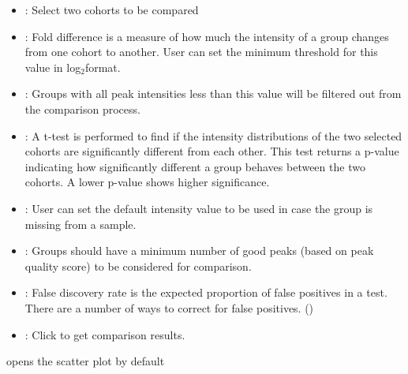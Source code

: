 \documentclass[letterpaper,10pt,english,openany,oneside]{sphinxmanual}
\begin{document}
\begin{itemize}
\item {} 
: Select two cohorts to be compared

\item {} 
: Fold difference is a measure of how much the intensity of a group changes from one cohort to another. User can set the minimum threshold for this value in log$_{\text{2}}$format.

\item {} 
: Groups with all peak intensities less than this value will be filtered out from the comparison process.

\item {} 
: A t-test is performed to find if the intensity distributions of the two selected cohorts are significantly different from each other. This test returns a p-value indicating how significantly different a group behaves between the two cohorts. A lower p-value shows higher significance.

\item {} 
: User can set the default intensity value to be used in case the group is missing from a sample.

\item {} 
: Groups should have a minimum number of good peaks (based on peak quality score) to be considered for comparison.

\item {} 
: False discovery rate is the expected proportion of false positives in a test. There are a number of ways to correct for false positives. ()

\item {} 
: Click to get comparison results.

\end{itemize}

 opens the scatter plot by default
\end{document}
